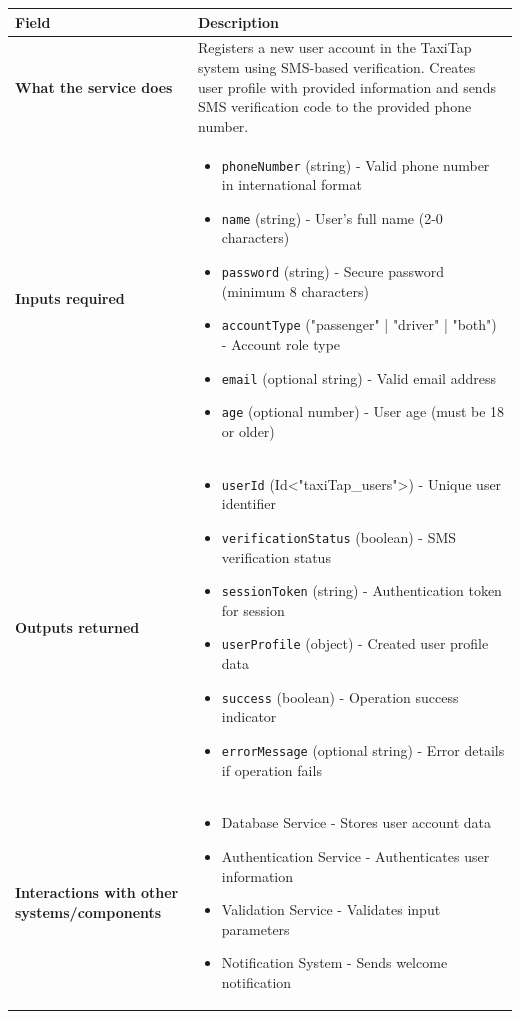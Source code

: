 \documentclass[11pt,a4paper]{article}
\begin{document}
\begin{longtable}{|p{4cm}|p{12cm}|}
\hline
\textbf{Field} & \textbf{Description} \\
\hline
\textbf{What the service does} & 
Registers a new user account in the TaxiTap system using SMS-based verification. Creates user profile with provided information and sends SMS verification code to the provided phone number. \\
\hline
\textbf{Inputs required} & 
\begin{itemize}[nosep]
\item \texttt{phoneNumber} (string) - Valid phone number in international format
\item \texttt{name} (string) - User's full name (2-0 characters)
\item \texttt{password} (string) - Secure password (minimum 8 characters)
\item \texttt{accountType} ("passenger" | "driver" | "both") - Account role type
\item \texttt{email} (optional string) - Valid email address
\item \texttt{age} (optional number) - User age (must be 18 or older)
\end{itemize} \\
\hline
\textbf{Outputs returned} & 
\begin{itemize}[nosep]
\item \texttt{userId} (Id<"taxiTap\_users">) - Unique user identifier
\item \texttt{verificationStatus} (boolean) - SMS verification status
\item \texttt{sessionToken} (string) - Authentication token for session
\item \texttt{userProfile} (object) - Created user profile data
\item \texttt{success} (boolean) - Operation success indicator
\item \texttt{errorMessage} (optional string) - Error details if operation fails
\end{itemize} \\
\hline
\textbf{Interactions with other systems/components   } & 
\begin{itemize}[nosep]
\item Database Service - Stores user account data
\item Authentication Service - Authenticates user information
\item Validation Service - Validates input parameters
\item Notification System - Sends welcome notification
\end{itemize} \\
\hline
\end{longtable}
\end{document}
